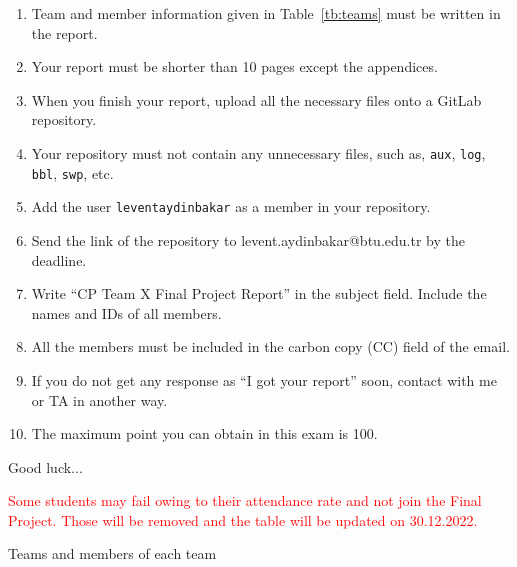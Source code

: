 \documentclass[addpoints]{exam}
\begin{document}
\begin{flushleft}
{{{\begin{enumerate}
    \item Team and member information given in Table~\ref{tb:teams} must be written in the report.
    \item Your report must be shorter than 10 pages except the appendices.
    \item When you finish your report, upload all the necessary files onto a GitLab repository.
    \item Your repository must not contain any unnecessary files, such as, \texttt{aux}, \texttt{log}, \texttt{bbl}, \texttt{swp}, etc.
    \item Add the user \texttt{leventaydinbakar} as a member in your repository.
    \item Send the link of the repository to levent.aydinbakar@btu.edu.tr by the deadline. 
    \item Write ``CP Team X Final Project Report'' in the subject field. Include the names and IDs of all members.
    \item All the members must be included in the carbon copy (CC) field of the email. 
    \item If you do not get any response as ``I got your report'' soon, contact with me or TA in another way.
    \item The maximum point you can obtain in this exam is 100. 
\end{enumerate}}}}

\vspace{2cm}

Good luck...

\end{flushleft}

\newpage

\Huge \textcolor{red}{Some students may fail owing to their attendance rate and not join the Final Project. Those will be removed and the table will be updated on 30.12.2022.}

\begin{table}
\caption{Teams and members of each team}
\label{tb:teams}
\end{table}
\end{document}
